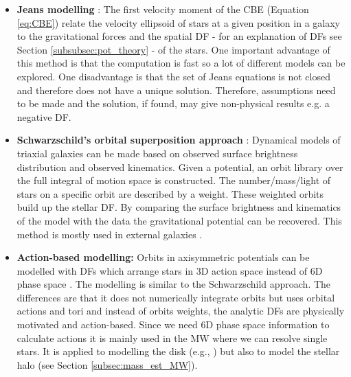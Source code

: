 \begin{itemize}
    \item \textbf{Jeans modelling} \citep{Jeans.....1915}: The first velocity moment of the \ac{CBE} (Equation \ref{eq:CBE}) relate the velocity ellipsoid of stars at a given position in a galaxy to the gravitational forces and the spatial \ac{DF} - for an explanation of \acp{DF} see Section \ref{subsubsec:pot_theory} - of the stars. One important advantage of this method is that the computation is fast so a lot of different models can be explored. One disadvantage is that the set of Jeans equations is not closed and therefore does not have a unique solution. Therefore, assumptions need to be made and the solution, if found, may give non-physical results e.g. a negative \ac{DF}. 
    \item \textbf{Schwarzschild's orbital superposition approach} \citep{Schwarzschild...1979}: Dynamical models of triaxial galaxies can be made based on observed surface brightness distribution and observed kinematics. Given a potential, an orbit library over the full integral of motion space is constructed. The number/mass/light of stars on a specific orbit are described by a weight. These weighted orbits build up the stellar \ac{DF}. By comparing the surface brightness and kinematics of the model with the data the gravitational potential can be recovered. This method is mostly used in external galaxies \citep{Rix...Schwarzschild...1997, vdBosch...Schwarzschild...2008, Vasiliev...Schwarzschild...2013, Ling...Schwarzschild...2018}.
    \item \textbf{Action-based modelling:} Orbits in axisymmetric potentials can be modelled with \acp{DF} which arrange stars in 3D action space instead of 6D phase space \citep{Binney...actionbasedmodelling...2012, Bovy...actionbasedmodelling...2013}. The modelling is similar to the Schwarzschild approach. The differences are that it does not numerically integrate orbits but uses orbital actions and tori and instead of orbits weights, the analytic \acp{DF} are physically motivated and action-based. Since we need 6D phase space information to calculate actions it is mainly used in the \ac{MW} where we can resolve single stars. It is applied to modelling the disk (e.g., \citealp{trick...ROADMAPPING...2016, Wilmathesis}) but also to model the stellar halo (see Section \ref{subsec:mass_est_MW}). 
\end{itemize}
